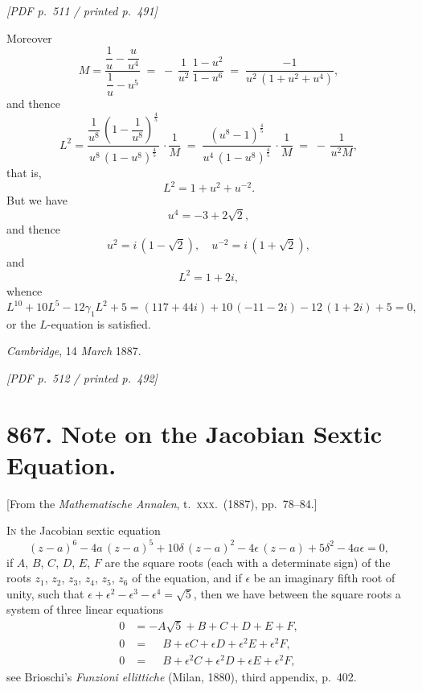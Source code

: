 \documentclass[11pt]{article}
\begin{document}
\vfill
\noindent\textit{[PDF p.~511 / printed p.~491]}
\newpage

\noindent Moreover
\[
M = \frac{\dfrac{1}{u} - \dfrac{u}{u^{4}}}{\dfrac{1}{u} - u^{5}}\;=\;-\,\frac{1}{u^{2}}\,\frac{1 - u^{2}}{1 - u^{6}}\;=\;\frac{-1}{u^{2}\,(1 + u^{2} + u^{4})},
\]
and thence
\[
L^{2} = \frac{\dfrac{1}{u^{8}}\,\left(1 - \dfrac{1}{u^{8}}\right)^{\frac{4}{5}}}{u^{8}\,(1 - u^{8})^{\frac{4}{5}}}\,\cdot\frac{1}{M}\;=\;\frac{(u^{8} - 1)^{\frac{4}{5}}}{u^{4}\,(1 - u^{8})^{\frac{4}{5}}}\,\cdot\frac{1}{M}\;=\;-\,\frac{1}{u^{2}M},
\]
that is,
\[
L^{2} = 1 + u^{2} + u^{-2}.
\]
But we have
\[
u^{4} = -3 + 2\sqrt{2},
\]
and thence
\[
u^{2} = i\,(1 - \sqrt{2}),\quad u^{-2} = i\,(1 + \sqrt{2}),
\]
and
\[
L^{2} = 1 + 2i,
\]
whence
\[
L^{10} + 10L^{5} - 12\gamma_{1}L^{2} + 5 = (117 + 44i) + 10\,(-11 - 2i) - 12\,(1 + 2i) + 5 = 0,
\]
or the $L$-equation is satisfied.

\medskip

\noindent\textit{Cambridge}, 14 \textit{March} 1887.

\vfill
\noindent\textit{[PDF p.~512 / printed p.~492]}
\newpage

\section*{867. Note on the Jacobian Sextic Equation.}

\begin{flushright}\small
[From the \textit{Mathematische Annalen}, t.~\textsc{xxx}.\ (1887), pp.~78--84.]
\end{flushright}

\medskip

\noindent\textsc{In} the Jacobian sextic equation
\[
(z - a)^{6} - 4a\,(z - a)^{5} + 10\delta\,(z - a)^{2} - 4\epsilon\,(z - a) + 5\delta^{2} - 4a\epsilon = 0,
\]
if $A$, $B$, $C$, $D$, $E$, $F$ are the square roots (each with a determinate sign) of the roots $z_{1}$, $z_{2}$, $z_{3}$, $z_{4}$, $z_{5}$, $z_{6}$ of the equation, and if $\epsilon$ be an imaginary fifth root of unity, such that $\epsilon + \epsilon^{2} - \epsilon^{3} - \epsilon^{4} = \sqrt{5}$, then we have between the square roots a system of three linear equations
\begin{align*}
0 &= -A\sqrt{5} + B + C + D + E + F, \\
0 &= \phantom{-}B + \epsilon C + \epsilon D + \epsilon^{2}E + \epsilon^{2}F, \\
0 &= \phantom{-}B + \epsilon^{2}C + \epsilon^{2}D + \epsilon E + \epsilon^{2}F,
\end{align*}
see Brioschi's \textit{Funzioni ellittiche} (Milan, 1880), third appendix, p.~402.
\end{document}
